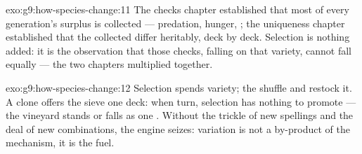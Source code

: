 \begin{solution}{exo:g9:how-species-change:11}
The checks chapter established that most of every
generation's surplus is collected --- predation, hunger,
; the uniqueness chapter established that the
collected differ heritably, deck by deck. Selection is
nothing added: it is the observation that those checks,
falling on that variety, cannot fall equally --- the two
chapters multiplied together.
\end{solution}

\begin{solution}{exo:g9:how-species-change:12}
Selection spends variety; the shuffle and 
restock it. A clone  offers the sieve one deck:
when  turn, selection has nothing to promote
--- the vineyard stands or falls as one . Without
the trickle of new spellings and the deal of new
combinations, the engine seizes: variation is not a
by-product of the mechanism, it is the fuel.
\end{solution}

